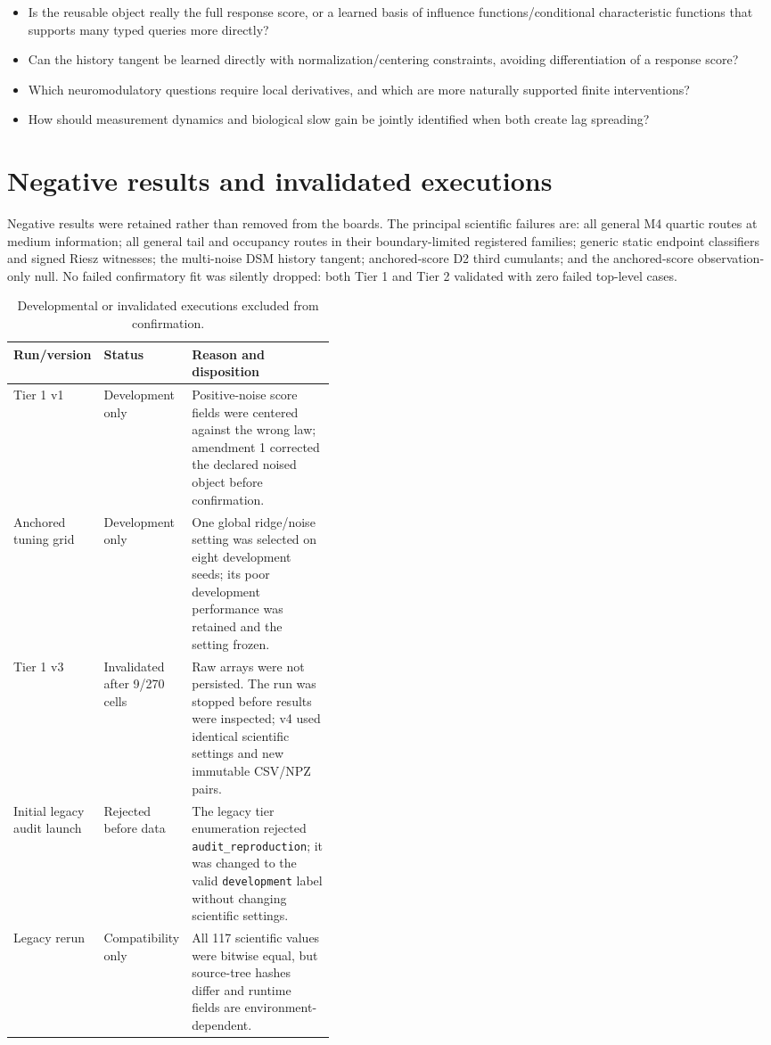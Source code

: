 \documentclass[11pt]{article}
\begin{document}
\begin{itemize}
\item Is the reusable object really the full response score, or a learned basis of
influence functions/conditional characteristic functions that supports many typed
queries more directly?
\item Can the history tangent be learned directly with normalization/centering
constraints, avoiding differentiation of a response score?
\item Which neuromodulatory questions require local derivatives, and which are more
naturally supported finite interventions?
\item How should measurement dynamics and biological slow gain be jointly
identified when both create lag spreading?
\end{itemize}

\appendix
\section{Negative results and invalidated executions}

Negative results were retained rather than removed from the boards.  The principal
scientific failures are: all general M4 quartic routes at medium information;
all general tail and occupancy routes in their boundary-limited registered
families; generic static endpoint classifiers and signed Riesz witnesses; the
multi-noise DSM history tangent; anchored-score D2 third cumulants; and the
anchored-score observation-only null.  No failed confirmatory fit was silently
dropped: both Tier 1 and Tier 2 validated with zero failed top-level cases.

\begin{table}[H]\centering\small
\caption{Developmental or invalidated executions excluded from confirmation.}
\begin{tabularx}{\linewidth}{p{0.18\linewidth}p{0.24\linewidth}X}
\toprule Run/version & Status & Reason and disposition\\\midrule
Tier 1 v1 & Development only & Positive-noise score fields were centered against
the wrong law; amendment 1 corrected the declared noised object before
confirmation.\\
Anchored tuning grid & Development only & One global ridge/noise setting was
selected on eight development seeds; its poor development performance was retained
and the setting frozen.\\
Tier 1 v3 & Invalidated after 9/270 cells & Raw arrays were not persisted.  The run
was stopped before results were inspected; v4 used identical scientific settings
and new immutable CSV/NPZ pairs.\\
Initial legacy audit launch & Rejected before data & The legacy tier enumeration
rejected \texttt{audit\_reproduction}; it was changed to the valid
\texttt{development} label without changing scientific settings.\\
Legacy rerun & Compatibility only & All 117 scientific values were bitwise equal,
but source-tree hashes differ and runtime fields are environment-dependent.\\
\bottomrule
\end{tabularx}
\end{table}
\end{document}
